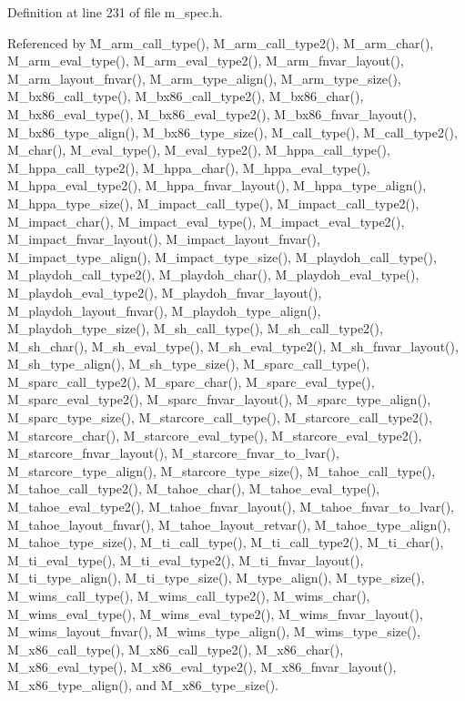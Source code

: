 Definition at line 231 of file m\_\-spec.h.

Referenced by M\_\-arm\_\-call\_\-type(), M\_\-arm\_\-call\_\-type2(), M\_\-arm\_\-char(), M\_\-arm\_\-eval\_\-type(), M\_\-arm\_\-eval\_\-type2(), M\_\-arm\_\-fnvar\_\-layout(), M\_\-arm\_\-layout\_\-fnvar(), M\_\-arm\_\-type\_\-align(), M\_\-arm\_\-type\_\-size(), M\_\-bx86\_\-call\_\-type(), M\_\-bx86\_\-call\_\-type2(), M\_\-bx86\_\-char(), M\_\-bx86\_\-eval\_\-type(), M\_\-bx86\_\-eval\_\-type2(), M\_\-bx86\_\-fnvar\_\-layout(), M\_\-bx86\_\-type\_\-align(), M\_\-bx86\_\-type\_\-size(), M\_\-call\_\-type(), M\_\-call\_\-type2(), M\_\-char(), M\_\-eval\_\-type(), M\_\-eval\_\-type2(), M\_\-hppa\_\-call\_\-type(), M\_\-hppa\_\-call\_\-type2(), M\_\-hppa\_\-char(), M\_\-hppa\_\-eval\_\-type(), M\_\-hppa\_\-eval\_\-type2(), M\_\-hppa\_\-fnvar\_\-layout(), M\_\-hppa\_\-type\_\-align(), M\_\-hppa\_\-type\_\-size(), M\_\-impact\_\-call\_\-type(), M\_\-impact\_\-call\_\-type2(), M\_\-impact\_\-char(), M\_\-impact\_\-eval\_\-type(), M\_\-impact\_\-eval\_\-type2(), M\_\-impact\_\-fnvar\_\-layout(), M\_\-impact\_\-layout\_\-fnvar(), M\_\-impact\_\-type\_\-align(), M\_\-impact\_\-type\_\-size(), M\_\-playdoh\_\-call\_\-type(), M\_\-playdoh\_\-call\_\-type2(), M\_\-playdoh\_\-char(), M\_\-playdoh\_\-eval\_\-type(), M\_\-playdoh\_\-eval\_\-type2(), M\_\-playdoh\_\-fnvar\_\-layout(), M\_\-playdoh\_\-layout\_\-fnvar(), M\_\-playdoh\_\-type\_\-align(), M\_\-playdoh\_\-type\_\-size(), M\_\-sh\_\-call\_\-type(), M\_\-sh\_\-call\_\-type2(), M\_\-sh\_\-char(), M\_\-sh\_\-eval\_\-type(), M\_\-sh\_\-eval\_\-type2(), M\_\-sh\_\-fnvar\_\-layout(), M\_\-sh\_\-type\_\-align(), M\_\-sh\_\-type\_\-size(), M\_\-sparc\_\-call\_\-type(), M\_\-sparc\_\-call\_\-type2(), M\_\-sparc\_\-char(), M\_\-sparc\_\-eval\_\-type(), M\_\-sparc\_\-eval\_\-type2(), M\_\-sparc\_\-fnvar\_\-layout(), M\_\-sparc\_\-type\_\-align(), M\_\-sparc\_\-type\_\-size(), M\_\-starcore\_\-call\_\-type(), M\_\-starcore\_\-call\_\-type2(), M\_\-starcore\_\-char(), M\_\-starcore\_\-eval\_\-type(), M\_\-starcore\_\-eval\_\-type2(), M\_\-starcore\_\-fnvar\_\-layout(), M\_\-starcore\_\-fnvar\_\-to\_\-lvar(), M\_\-starcore\_\-type\_\-align(), M\_\-starcore\_\-type\_\-size(), M\_\-tahoe\_\-call\_\-type(), M\_\-tahoe\_\-call\_\-type2(), M\_\-tahoe\_\-char(), M\_\-tahoe\_\-eval\_\-type(), M\_\-tahoe\_\-eval\_\-type2(), M\_\-tahoe\_\-fnvar\_\-layout(), M\_\-tahoe\_\-fnvar\_\-to\_\-lvar(), M\_\-tahoe\_\-layout\_\-fnvar(), M\_\-tahoe\_\-layout\_\-retvar(), M\_\-tahoe\_\-type\_\-align(), M\_\-tahoe\_\-type\_\-size(), M\_\-ti\_\-call\_\-type(), M\_\-ti\_\-call\_\-type2(), M\_\-ti\_\-char(), M\_\-ti\_\-eval\_\-type(), M\_\-ti\_\-eval\_\-type2(), M\_\-ti\_\-fnvar\_\-layout(), M\_\-ti\_\-type\_\-align(), M\_\-ti\_\-type\_\-size(), M\_\-type\_\-align(), M\_\-type\_\-size(), M\_\-wims\_\-call\_\-type(), M\_\-wims\_\-call\_\-type2(), M\_\-wims\_\-char(), M\_\-wims\_\-eval\_\-type(), M\_\-wims\_\-eval\_\-type2(), M\_\-wims\_\-fnvar\_\-layout(), M\_\-wims\_\-layout\_\-fnvar(), M\_\-wims\_\-type\_\-align(), M\_\-wims\_\-type\_\-size(), M\_\-x86\_\-call\_\-type(), M\_\-x86\_\-call\_\-type2(), M\_\-x86\_\-char(), M\_\-x86\_\-eval\_\-type(), M\_\-x86\_\-eval\_\-type2(), M\_\-x86\_\-fnvar\_\-layout(), M\_\-x86\_\-type\_\-align(), and M\_\-x86\_\-type\_\-size().
